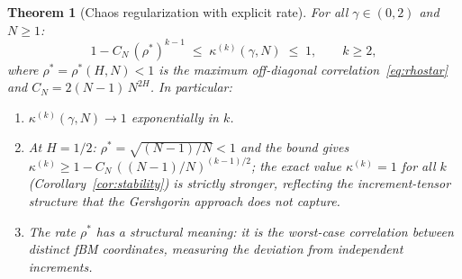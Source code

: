 \documentclass[11pt,a4paper]{article}
\theoremstyle{plain}
\newtheorem{theorem}{Theorem}[section]
\theoremstyle{definition}
\theoremstyle{remark}
\begin{document}
\begin{theorem}[Chaos regularization with explicit rate]
\label{thm:regularization}
For all $\gamma \in (0,2)$ and $N \geq 1$:
\begin{equation}\label{eq:regularization}
  1 - C_N\,(\rho^*)^{k-1}
  \;\leq\; \kappa^{(k)}(\gamma,N)
  \;\leq\; 1,
  \qquad k \geq 2,
\end{equation}
where $\rho^* = \rho^*(H,N) < 1$ is the maximum
off-diagonal correlation~\eqref{eq:rhostar} and
$C_N = 2(N{-}1)\,N^{2H}$.
In particular:
\begin{enumerate}[label=\textup{(\roman*)}]
\item $\kappa^{(k)}(\gamma,N) \to 1$
  exponentially in $k$.
\item At $H = 1/2$: $\rho^* = \sqrt{(N{-}1)/N} < 1$
  and the bound gives
  $\kappa^{(k)} \geq 1 - C_N\,((N{-}1)/N)^{(k-1)/2}$;
  the exact value $\kappa^{(k)} = 1$ for all $k$
  (Corollary~\textup{\ref{cor:stability}}) is strictly
  stronger, reflecting the increment-tensor structure
  that the Gershgorin approach does not capture.
\item The rate $\rho^*$ has a structural meaning:
  it is the worst-case correlation between distinct
  fBM coordinates, measuring the deviation from
  independent increments.
\end{enumerate}
\end{theorem}
\end{document}

